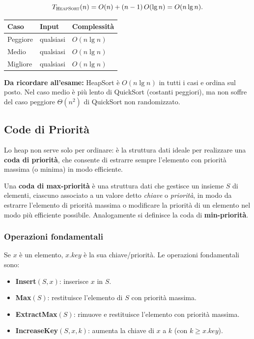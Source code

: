 \[
T_{\textsc{HeapSort}}(n) = O(n) + (n-1)\,O(\lg n) = O(n \lg n).
\]

\begin{center}
	\begin{tabular}{lll}
		\toprule
		\textbf{Caso} & \textbf{Input} & \textbf{Complessità} \\
		\midrule
		Peggiore & qualsiasi & $O(n \lg n)$ \\
		Medio    & qualsiasi & $O(n \lg n)$ \\
		Migliore & qualsiasi & $O(n \lg n)$ \\
		\bottomrule
	\end{tabular}
\end{center}

\begin{hardnote}
	\textbf{Da ricordare all'esame:} HeapSort è $O(n \lg n)$ in tutti i
	casi e ordina sul posto. Nel caso medio è più lento di QuickSort
	(costanti peggiori), ma non soffre del caso peggiore $\Theta(n^2)$ di
	QuickSort non randomizzato.
\end{hardnote}

\subsection{Code di Priorità}

\begin{softnote}
	Lo heap non serve solo per ordinare: è la struttura dati ideale per
	realizzare una \textbf{coda di priorità}, che consente di estrarre
	sempre l'elemento con priorità massima (o minima) in modo efficiente.
\end{softnote}

\begin{definizione}
	Una \textbf{coda di max-priorità} è una struttura dati che gestisce
	un insieme $S$ di elementi, ciascuno associato a un valore detto
	\emph{chiave} o \emph{priorità}, in modo da estrarre l'elemento di
	priorità massima o modificare la priorità di un elemento nel modo più
	efficiente possibile. Analogamente si definisce la coda di
	\textbf{min-priorità}.
\end{definizione}

\subsubsection{Operazioni fondamentali}

Se $x$ è un elemento, $x.\mathit{key}$ è la sua chiave/priorità.
Le operazioni fondamentali sono:
\begin{itemize}
	\item \textbf{Insert}$(S, x)$: inserisce $x$ in $S$.
	\item \textbf{Max}$(S)$: restituisce l'elemento di $S$ con priorità
	massima.
	\item \textbf{ExtractMax}$(S)$: rimuove e restituisce l'elemento con
	priorità massima.
	\item \textbf{IncreaseKey}$(S, x, k)$: aumenta la chiave di $x$ a
	$k$ (con $k \ge x.\mathit{key}$).
\end{itemize}

